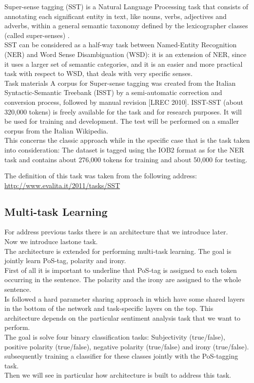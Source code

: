 \documentclass[twocolumn,10pt]{wmrDoc}
\begin{document}
Super-sense tagging (SST) is a Natural Language Processing task that consists of annotating each significant entity in text, like nouns, verbs, adjectives and adverbs, within a general semantic taxonomy defined by the lexicographer classes (called super-senses) .\\
SST can be considered as a half-way task between Named-Entity Recognition (NER) and Word Sense Disambiguation (WSD): it is an extension of NER, since it uses a larger set of semantic categories, and it is an easier and more practical task with respect to WSD, that deals with very specific senses.\\
Task materials A corpus for Super-sense tagging was created from the Italian Syntactic-Semantic Treebank (ISST) by a semi-automatic correction and conversion process, followed by manual revision [LREC 2010]. ISST-SST (about 320,000 tokens) is freely available for the task and for research purposes. It will be used for training and development. The test will be performed on a smaller corpus from the Italian Wikipedia.\\
This concerns the classic approach while in the specific case that is the task taken into consideration:
The dataset is tagged using the IOB2 format as for the NER task and contains about 276,000 tokens for training and about 50,000 for testing.



The definition of this task was taken from the following address: \url {http://www.evalita.it/2011/tasks/SST}



\subsection{Multi-task Learning}
For address previous tasks there is an architecture that we introduce later.\\
Now we introduce lastone task.\\
The architecture is extended for performing multi-task learning.
The goal is jointly learn PoS-tag, polarity and irony. \\
First of all it is important to underline that PoS-tag is assigned to each token occurring in the sentence. The polarity and the irony are assigned to the whole sentence.\\
Is followed a hard parameter sharing approach in which have some shared layers in the bottom of the network and task-specific layers on the top.
This architecture depends on the particular sentiment analysis task that we want to perform.\\
The goal is  solve four binary classification tasks: Subjectivity (true/false), positive polarity  (true/false), negative polarity (true/false) and irony (true/false).
 subsequently training a classifier for these classes jointly with the PoS-tagging task.\\
 Then we will see in particular how architecture is built to address this task.
\end{document}
